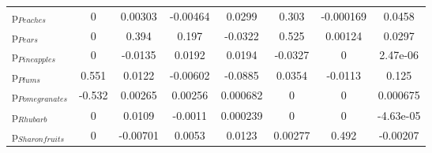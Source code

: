 \documentclass[11pt]{article}
\begin{document}
\begin{table}[h]
\begin{center}
\begin{tabular}{lccccccc}
p$_{Peaches}$ &0 &0.00303 &-0.00464 &0.0299 &0.303 &-0.000169 &0.0458 \\
p$_{Pears}$ &0 &0.394 &0.197 &-0.0322 &0.525 &0.00124 &0.0297 \\
p$_{Pineapples}$ &0 &-0.0135 &0.0192 &0.0194 &-0.0327 &0 &2.47e-06 \\
p$_{Plums}$ &0.551 &0.0122 &-0.00602 &-0.0885 &0.0354 &-0.0113 &0.125 \\
p$_{Pomegranates}$ &-0.532 &0.00265 &0.00256 &0.000682 &0 &0 &0.000675 \\
p$_{Rhubarb}$ &0 &0.0109 &-0.0011 &0.000239 &0 &0 &-4.63e-05 \\
p$_{Sharon fruits}$ &0 &-0.00701 &0.0053 &0.0123 &0.00277 &0.492 &-0.00207 \\
\end{tabular}
\end{center}
\end{table}
\end{document}
